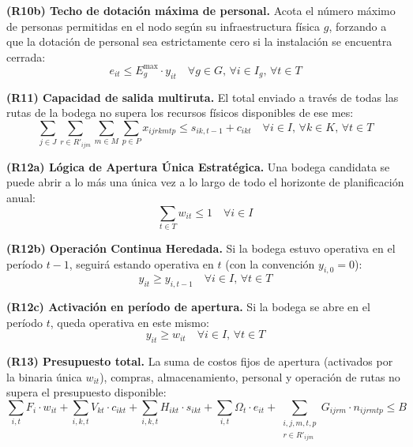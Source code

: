 \documentclass[letterpaper]{article}
\begin{document}
\begin{flushleft}
\textbf{(R10b) Techo de dotaci\'on m\'axima de personal.} Acota el n\'umero m\'aximo de personas permitidas en el nodo seg\'un su infraestructura f\'isica $g$, forzando a que la dotaci\'on de personal sea estrictamente cero si la instalaci\'on se encuentra cerrada:
\begin{equation}
e_{it} \leq E^{\max}_g \cdot y_{it} \quad \forall g \in G,\, \forall i \in I_g,\, \forall t \in T
\end{equation}

\textbf{(R11) Capacidad de salida multiruta.} El total enviado a trav\'es de todas las rutas de la bodega no supera los recursos f\'isicos disponibles de ese mes:
\begin{equation}
\sum_{j \in J} \sum_{r \in R'_{ijm}} \sum_{m \in M} \sum_{p \in P} x_{ijrkmtp} \leq s_{ik,t-1} + c_{ikt}
\quad \forall i \in I,\, \forall k \in K,\, \forall t \in T
\end{equation}

\textbf{(R12a) L\'ogica de Apertura \'Unica Estrat\'egica.} Una bodega candidata se puede abrir a lo m\'as una \'unica vez a lo largo de todo el horizonte de planificaci\'on anual:
\begin{equation}
\sum_{t \in T} w_{it} \leq 1 \quad \forall i \in I
\end{equation}

\textbf{(R12b) Operaci\'on Continua Heredada.} Si la bodega estuvo operativa en el per\'iodo $t-1$, seguir\'a estando operativa en $t$ (con la convenci\'on $y_{i,0} = 0$):
\begin{equation}
y_{it} \geq y_{i,t-1} \quad \forall i \in I,\, \forall t \in T
\end{equation}

\textbf{(R12c) Activaci\'on en per\'iodo de apertura.} Si la bodega se abre en el per\'iodo $t$, queda operativa en este mismo:
\begin{equation}
y_{it} \geq w_{it} \quad \forall i \in I,\, \forall t \in T
\end{equation}

\textbf{(R13) Presupuesto total.} La suma de costos fijos de apertura (activados por la binaria \'unica $w_{it}$), compras, almacenamiento, personal y operaci\'on de rutas no supera el presupuesto disponible:
\begin{equation}
\sum_{i,t} F_i \cdot w_{it} + \sum_{i,k,t} V_{kt} \cdot c_{ikt} + \sum_{i,k,t} H_{ikt} \cdot s_{ikt} + \sum_{i,t} \Omega_t \cdot e_{it} + \sum_{\substack{i,j,m,t,p \\ r \in R'_{ijm}}} G_{ijrm} \cdot n_{ijrmtp} \leq B
\end{equation}


\end{flushleft}
\end{document}
